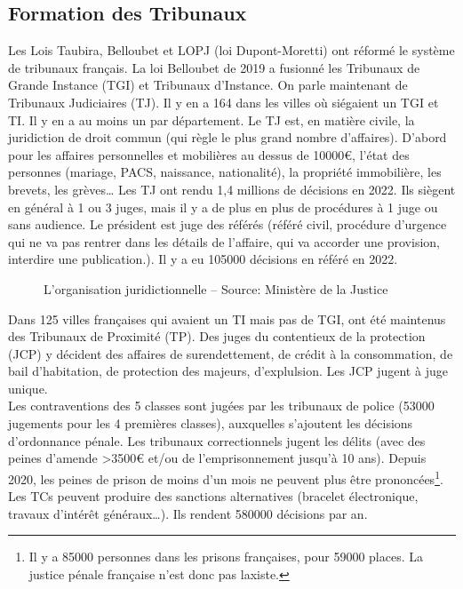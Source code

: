 \documentclass[math]{cours}
\begin{document}
\subsection{Formation des Tribunaux}
Les Lois Taubira, Belloubet et LOPJ (loi Dupont-Moretti) ont réformé le système de tribunaux français.
La loi Belloubet de 2019 a fusionné les Tribunaux de Grande Instance (TGI) et Tribunaux d'Instance.
On parle maintenant de Tribunaux Judiciaires (TJ). Il y en a 164 dans les villes où siégaient un TGI et TI.
Il y en a au moins un par département.
Le TJ est, en matière civile, la juridiction de droit commun (qui règle le plus grand nombre d'affaires).
D'abord pour les affaires personnelles et mobilières au dessus de 10000€, l'état des personnes (mariage, PACS, naissance, nationalité), la propriété immobilière, les brevets, les grèves\ldots
Les TJ ont rendu 1,4 millions de décisions en 2022.
Ils siègent en général à 1 ou 3 juges, mais il y a de plus en plus de procédures à 1 juge ou sans audience.
Le président est juge des référés (référé civil, procédure d'urgence qui ne va pas rentrer dans les détails de l'affaire, qui va accorder une provision, interdire une publication.). Il y a eu 105000 décisions en référé en 2022.
\begin{figure}[h]
	\centering
	\caption{L'organisation juridictionnelle -- Source: Ministère de la Justice}
	\label{fig:orga_juridictionnelle}
\end{figure}
Dans 125 villes françaises qui avaient un TI mais pas de TGI, ont été maintenus des Tribunaux de Proximité (TP).
Des juges du contentieux de la protection (JCP) y décident des affaires de surendettement, de crédit à la consommation, de bail d'habitation, de protection des majeurs, d'explulsion.
Les JCP jugent à juge unique.\\
Les contraventions des 5 classes sont jugées par les tribunaux de police (53000 jugements pour les 4 premières classes), auxquelles s'ajoutent les décisions d'ordonnance pénale.
Les tribunaux correctionnels jugent les délits (avec des peines d'amende >3500€ et/ou de l'emprisonnement jusqu'à 10 ans).
Depuis 2020, les peines de prison de moins d'un mois ne peuvent plus être prononcées\footnote{Il y a 85000 personnes dans les prisons françaises, pour 59000 places. La justice pénale française n'est donc pas laxiste.}.
Les TCs peuvent produire des sanctions alternatives (bracelet électronique, travaux d'intérêt généraux\ldots). Ils rendent 580000 décisions par an.\\
\end{document}
